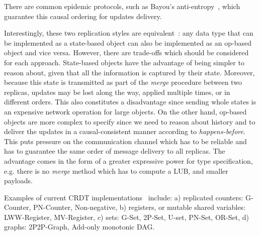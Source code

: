 There are common epidemic protocols, such as Bayou's
anti-entropy~\cite{Petersen:1997:FUP:268998.266711}, which guarantee this
causal ordering for updates delivery.

Interestingly, these two replication styles are
equivalent~\cite{Shapiro:2011:CRD:2050613.2050642}: any data type that can be
implemented as a state-based object can also be implemented as an op-based
object and vice versa. However, there are trade-offs which should be considered
for each approach. State-based objects have the advantage of being simpler to
reason about, given that all the information is captured by their state.
Moreover, because this state is transmitted as part of the \textit{merge}
procedure between two replicas, updates may be lost along the way, applied
multiple times, or in different orders. This also constitutes a disadvantage
since sending whole states is an expensive network operation for large
objects. On the other hand, op-based objects are more complex to specify since
we need to reason about history and to deliver the updates in a
causal-consistent manner according to \textit{happens-before}. This puts
pressure on the communication channel which has to be reliable and has to
guarantee the same order of message delivery to all replicas. The advantage
comes in the form of a greater expressive power for type specification, e.g.
there is no \textit{merge} method which has to compute a LUB, and smaller
payloads.

Examples of current CRDT implementations~\cite{shapiro:inria-00555588} include:
a) replicated counters: G-Counter, PN-Counter, Non-negative, b) registers, or
mutable shared variables: LWW-Register, MV-Register, c) sets: G-Set, 2P-Set,
U-set, PN-Set, OR-Set, d) graphs: 2P2P-Graph, Add-only monotonic DAG. 
